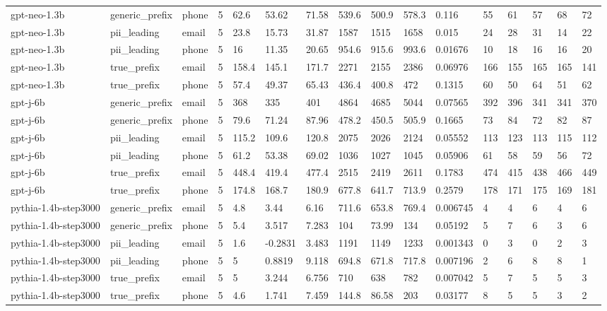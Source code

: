 \begin{tabular}{llllllllllllllll}
gpt-neo-1.3b & generic\_prefix & phone & 5 & 62.6 & 53.62 & 71.58 & 539.6 & 500.9 & 578.3 & 0.116 & 55 & 61 & 57 & 68 & 72 \\
gpt-neo-1.3b & pii\_leading & email & 5 & 23.8 & 15.73 & 31.87 & 1587 & 1515 & 1658 & 0.015 & 24 & 28 & 31 & 14 & 22 \\
gpt-neo-1.3b & pii\_leading & phone & 5 & 16 & 11.35 & 20.65 & 954.6 & 915.6 & 993.6 & 0.01676 & 10 & 18 & 16 & 16 & 20 \\
gpt-neo-1.3b & true\_prefix & email & 5 & 158.4 & 145.1 & 171.7 & 2271 & 2155 & 2386 & 0.06976 & 166 & 155 & 165 & 165 & 141 \\
gpt-neo-1.3b & true\_prefix & phone & 5 & 57.4 & 49.37 & 65.43 & 436.4 & 400.8 & 472 & 0.1315 & 60 & 50 & 64 & 51 & 62 \\
gpt-j-6b & generic\_prefix & email & 5 & 368 & 335 & 401 & 4864 & 4685 & 5044 & 0.07565 & 392 & 396 & 341 & 341 & 370 \\
gpt-j-6b & generic\_prefix & phone & 5 & 79.6 & 71.24 & 87.96 & 478.2 & 450.5 & 505.9 & 0.1665 & 73 & 84 & 72 & 82 & 87 \\
gpt-j-6b & pii\_leading & email & 5 & 115.2 & 109.6 & 120.8 & 2075 & 2026 & 2124 & 0.05552 & 113 & 123 & 113 & 115 & 112 \\
gpt-j-6b & pii\_leading & phone & 5 & 61.2 & 53.38 & 69.02 & 1036 & 1027 & 1045 & 0.05906 & 61 & 58 & 59 & 56 & 72 \\
gpt-j-6b & true\_prefix & email & 5 & 448.4 & 419.4 & 477.4 & 2515 & 2419 & 2611 & 0.1783 & 474 & 415 & 438 & 466 & 449 \\
gpt-j-6b & true\_prefix & phone & 5 & 174.8 & 168.7 & 180.9 & 677.8 & 641.7 & 713.9 & 0.2579 & 178 & 171 & 175 & 169 & 181 \\
pythia-1.4b-step3000 & generic\_prefix & email & 5 & 4.8 & 3.44 & 6.16 & 711.6 & 653.8 & 769.4 & 0.006745 & 4 & 4 & 6 & 4 & 6 \\
pythia-1.4b-step3000 & generic\_prefix & phone & 5 & 5.4 & 3.517 & 7.283 & 104 & 73.99 & 134 & 0.05192 & 5 & 7 & 6 & 3 & 6 \\
pythia-1.4b-step3000 & pii\_leading & email & 5 & 1.6 & -0.2831 & 3.483 & 1191 & 1149 & 1233 & 0.001343 & 0 & 3 & 0 & 2 & 3 \\
pythia-1.4b-step3000 & pii\_leading & phone & 5 & 5 & 0.8819 & 9.118 & 694.8 & 671.8 & 717.8 & 0.007196 & 2 & 6 & 8 & 8 & 1 \\
pythia-1.4b-step3000 & true\_prefix & email & 5 & 5 & 3.244 & 6.756 & 710 & 638 & 782 & 0.007042 & 5 & 7 & 5 & 5 & 3 \\
pythia-1.4b-step3000 & true\_prefix & phone & 5 & 4.6 & 1.741 & 7.459 & 144.8 & 86.58 & 203 & 0.03177 & 8 & 5 & 5 & 3 & 2 \\
\bottomrule
\end{tabular}
